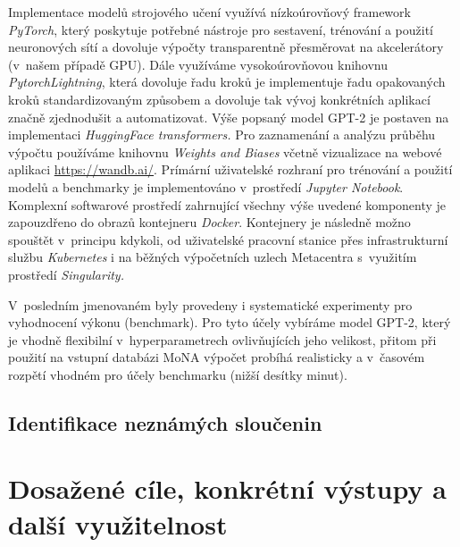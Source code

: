 \documentclass[a4paper,11pt]{article}
\begin{document}
Implementace modelů strojového učení využívá nízkoúrovňový framework \emph{PyTorch}, který poskytuje
potřebné nástroje pro sestavení, trénování a použití neuronových sítí a dovoluje výpočty transparentně
přesměrovat na akcelerátory (v~našem případě GPU).
Dále využíváme vysokoúrovňovou knihovnu \emph{PytorchLightning}, která dovoluje řadu kroků
je implementuje řadu opakovaných kroků standardizovaným způsobem a dovoluje tak vývoj konkrétních aplikací
značně zjednodušit a automatizovat.
Výše popsaný model GPT-2 je postaven na implementaci \emph{HuggingFace transformers.}
Pro zaznamenání a analýzu průběhu výpočtu používáme knihovnu \emph{Weights and Biases} včetně vizualizace na webové aplikaci
\url{https://wandb.ai/}.
Prímární uživatelské rozhraní pro trénování a použití modelů a benchmarky je implementováno v~prostředí
\emph{Jupyter Notebook}.
Komplexní softwarové prostředí zahrnující všechny výše uvedené komponenty je zapouzdřeno do
obrazů kontejneru \emph{Docker}.
Kontejnery je následně možno spouštět v~principu kdykoli, od uživatelské pracovní stanice přes
infrastrukturní službu \emph{Kubernetes} i na běžných výpočetních uzlech Metacentra s~využitím 
prostředí \emph{Singularity.} 

V~posledním jmenovaném byly provedeny i systematické experimenty pro vyhodnocení výkonu (benchmark).
Pro tyto účely vybíráme model GPT-2, který je vhodně flexibilní v~hyperparametrech ovlivňujících jeho velikost,
přitom při použití na vstupní databázi MoNA výpočet probíhá realisticky a v~časovém rozpětí vhodném
pro účely benchmarku (nižší desítky minut).



\subsection{Identifikace neznámých sloučenin}












\section{Dosažené cíle, konkrétní výstupy a další využitelnost}
\label{cile}
\end{document}
